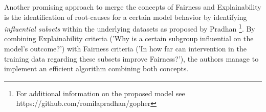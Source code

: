




Another promising approach to merge the concepts of Fairness and Explainability is the identification of root-causes for a certain model behavior by identifying \textit{influential subsets} within the underlying datasets as proposed by Pradhan \parencite{Pradhan2022}\footnote{For additional information on the proposed model see https://github.com/romilapradhan/gopher}.
By combining Explainability criteria ('Why is a certain subgroup influential on the model's outcome?') with Fairness criteria ('In how far can intervention in the training data regarding these subsets improve Fairness?'), the authors manage to implement an efficient algorithm combining both concepts.

